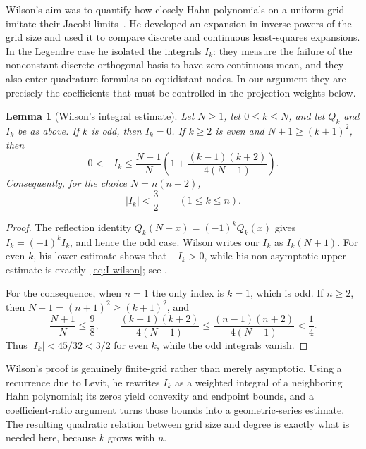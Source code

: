 \documentclass[11pt]{article}
\newtheorem{lemma}[theorem]{Lemma}
\theoremstyle{definition}
\theoremstyle{remark}
\begin{document}
Wilson's aim was to quantify how closely Hahn polynomials on a uniform grid
imitate their Jacobi limits~\cite{wilson-hahn}.  He developed an expansion in
inverse powers of the grid size and used it to compare discrete and continuous
least-squares expansions.  In the Legendre case he isolated the integrals
\(I_k\): they measure the failure of the nonconstant discrete orthogonal basis
to have zero continuous mean, and they also enter quadrature formulas on
equidistant nodes.  In our argument they are precisely the coefficients that
must be controlled in the projection weights below.

\begin{lemma}[Wilson's integral estimate]\label{lem:wilson-integral}
Let \(N\geq1\), let \(0\leq k\leq N\), and let \(Q_k\) and \(I_k\) be as
above.  If \(k\) is odd, then \(I_k=0\).  If \(k\geq2\) is even and
\(N+1\geq(k+1)^2\), then
\begin{equation}\label{eq:I-wilson}
  0<-I_k\leq\frac{N+1}{N}
  \left(1+\frac{(k-1)(k+2)}{4(N-1)}\right).
\end{equation}
Consequently, for the choice \(N=n(n+2)\),
\begin{equation}\label{eq:I-bound}
  |I_k|<\frac32\qquad(1\leq k\leq n).
\end{equation}
\end{lemma}

\begin{proof}
The reflection identity \(Q_k(N-x)=(-1)^kQ_k(x)\) gives
\(I_k=(-1)^kI_k\), and hence the odd case.  Wilson writes our \(I_k\) as
\(I_k(N+1)\).  For even \(k\), his lower estimate shows that \(-I_k>0\),
while his non-asymptotic upper estimate is exactly~\eqref{eq:I-wilson}; see
\cite[Sec.~3, Eqs.~(3.1) and (3.14)]{wilson-hahn}.

For the consequence, when \(n=1\) the only index is \(k=1\), which is odd.
If \(n\geq2\), then
\(N+1=(n+1)^2\geq(k+1)^2\), and
\[
  \frac{N+1}{N}\leq\frac98,
  \qquad
  \frac{(k-1)(k+2)}{4(N-1)}
  \leq\frac{(n-1)(n+2)}{4(N-1)}<\frac14.
\]
Thus \(|I_k|<45/32<3/2\) for even \(k\), while the odd integrals vanish.
\end{proof}

Wilson's proof is genuinely finite-grid rather than merely asymptotic.  Using
a recurrence due to Levit, he rewrites \(I_k\) as a weighted integral of a
neighboring Hahn polynomial; its zeros yield convexity and endpoint bounds,
and a coefficient-ratio argument turns those bounds into a geometric-series
estimate.  The resulting quadratic relation between grid size and degree is
exactly what is needed here, because \(k\) grows with \(n\).
\end{document}
